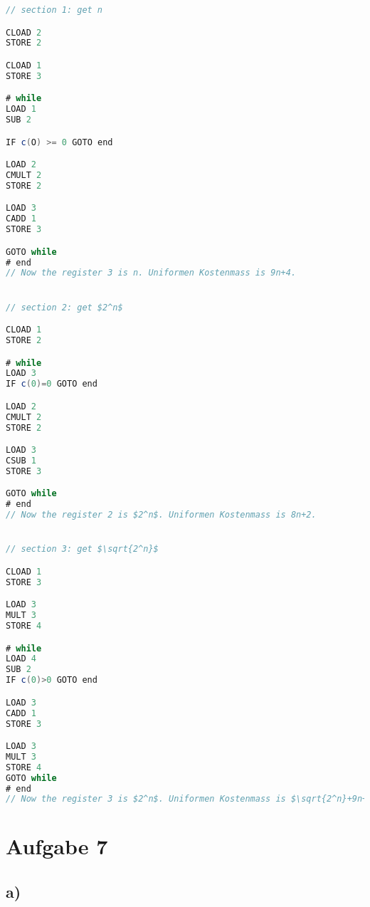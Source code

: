 \documentclass[a4paper,11pt]{scrartcl}
\begin{document}
\begin{lstlisting}[language=java, mathescape=true]
// section 1: get n

CLOAD 2
STORE 2

CLOAD 1
STORE 3

# while
LOAD 1
SUB 2

IF c(O) >= 0 GOTO end

LOAD 2
CMULT 2
STORE 2

LOAD 3
CADD 1
STORE 3

GOTO while
# end
// Now the register 3 is n. Uniformen Kostenmass is 9n+4.


// section 2: get $2^n$

CLOAD 1
STORE 2

# while
LOAD 3
IF c(0)=0 GOTO end

LOAD 2
CMULT 2
STORE 2

LOAD 3
CSUB 1
STORE 3

GOTO while
# end
// Now the register 2 is $2^n$. Uniformen Kostenmass is 8n+2.


// section 3: get $\sqrt{2^n}$

CLOAD 1
STORE 3

LOAD 3
MULT 3
STORE 4

# while
LOAD 4
SUB 2
IF c(0)>0 GOTO end

LOAD 3
CADD 1
STORE 3

LOAD 3
MULT 3
STORE 4
GOTO while
# end
// Now the register 3 is $2^n$. Uniformen Kostenmass is $\sqrt{2^n}+9n+5$.
\end{lstlisting}


\section*{Aufgabe 7}

\subsection*{a)}
\end{document}
